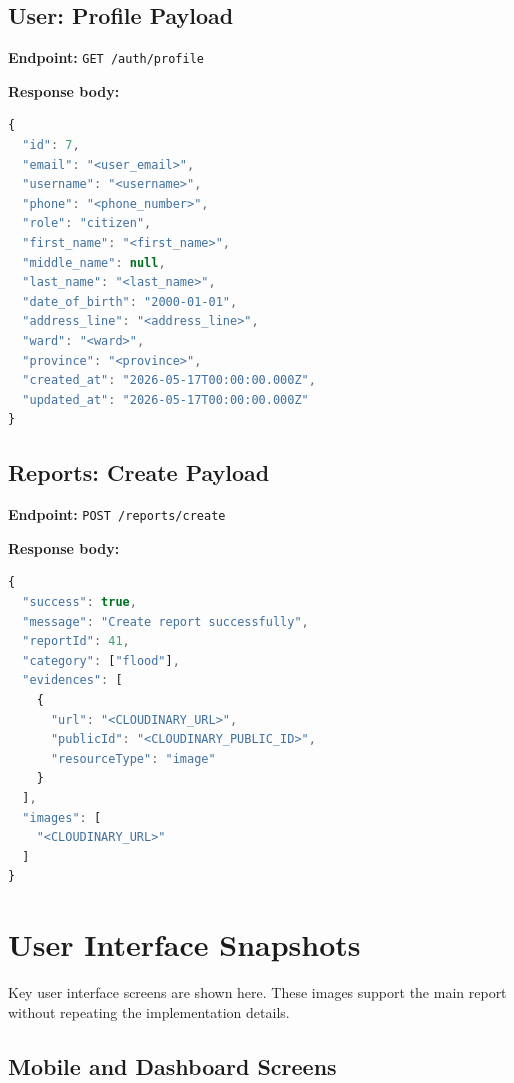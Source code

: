 \section{User: Profile Payload}

\textbf{Endpoint:} \texttt{GET /auth/profile}

\textbf{Response body:}
\begin{lstlisting}[language=JavaScript, caption=User Profile Response, label=lst:profile-response]
{
  "id": 7,
  "email": "<user_email>",
  "username": "<username>",
  "phone": "<phone_number>",
  "role": "citizen",
  "first_name": "<first_name>",
  "middle_name": null,
  "last_name": "<last_name>",
  "date_of_birth": "2000-01-01",
  "address_line": "<address_line>",
  "ward": "<ward>",
  "province": "<province>",
  "created_at": "2026-05-17T00:00:00.000Z",
  "updated_at": "2026-05-17T00:00:00.000Z"
}
\end{lstlisting}

\section{Reports: Create Payload}

\textbf{Endpoint:} \texttt{POST /reports/create}

\textbf{Response body:}
\begin{lstlisting}[language=JavaScript, caption=Create Report Response, label=lst:create-report-response]
{
  "success": true,
  "message": "Create report successfully",
  "reportId": 41,
  "category": ["flood"],
  "evidences": [
    {
      "url": "<CLOUDINARY_URL>",
      "publicId": "<CLOUDINARY_PUBLIC_ID>",
      "resourceType": "image"
    }
  ],
  "images": [
    "<CLOUDINARY_URL>"
  ]
}
\end{lstlisting}

\chapter{User Interface Snapshots}

Key user interface screens are shown here. These images support the main report without repeating the implementation details.

\FloatBarrier
\section{Mobile and Dashboard Screens}

